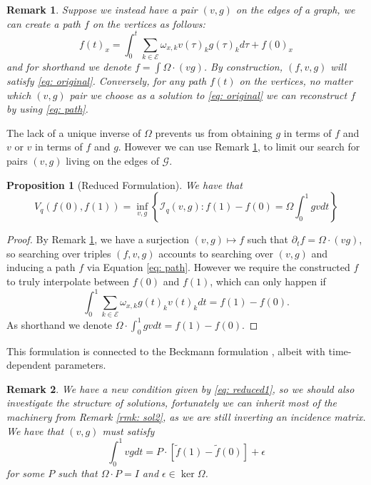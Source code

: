 \documentclass[conference]{IEEEtran}
\newcommand{\GG}{\mathcal{G}}
\newcommand{\EE}{\mathcal{E}}
\theoremstyle{ieeestyle}
\newtheorem{prop}{Proposition}
\newtheorem{rmk}{Remark}
\begin{document}
\begin{rmk}\label{rmk: sol1}
    Suppose we instead have a pair $(v,g)$ on the edges of a graph, we can create a path $f$ on the vertices as follows:
    \begin{equation}\label{eq: path}
        f(t)_x = \int_0^t \sum_{k \in \EE} \omega_{x,k}v(\tau)_kg(\tau)_k d\tau + f(0)_x
    \end{equation}
    and for shorthand we denote $f = \int \Omega \cdot(vg)$. By construction, $(f,v,g)$ will satisfy \eqref{eq: original}. Conversely, for any path $f(t)$ on the vertices, no matter which $(v,g)$ pair we choose as a solution to \eqref{eq: original} we can reconstruct $f$ by using \eqref{eq: path}.
\end{rmk}
The lack of a unique inverse of $\Omega$ prevents us from obtaining $g$ in terms of $f$ and $v$ or $v$ in terms of $f$ and $g$. However we can use Remark \ref{rmk: sol1}, to limit our search for pairs $(v,g)$ living on the edges of $\GG$. 
\begin{prop}[Reduced Formulation]\label{thm: simple}
    We have that
    \begin{equation*}
        V_q(f(0),f(1))= \inf_{v,g} \left\{ \mathcal{I}_q(v,g) : f(1) - f(0) = \Omega \textstyle \int_0^1 gv dt \right\}
    \end{equation*}
\end{prop}
\begin{proof}
    By Remark \ref{rmk: sol1}, we have a surjection $(v,g) \mapsto f$ such that $\partial_t f = \Omega \cdot (vg)$, so searching over triples $(f,v,g)$ accounts to searching over $(v,g)$ and inducing a path $f$ via Equation \eqref{eq: path}. However we require the constructed $f$ to truly interpolate between $f(0)$ and $f(1)$, which can only happen if 
    \begin{equation}\label{eq: reduced1}
        \int_0^1 \sum_{k \in \EE} \omega_{x,k}g(t)_kv(t)_k dt = f(1) - f(0).
    \end{equation}
    As shorthand we denote $\Omega \cdot \int_0^1 gv dt = f(1) - f(0)$.
\end{proof}
This formulation is connected to the Beckmann formulation \cite{beckmann1952continuous}, albeit with time-dependent parameters.
\begin{rmk}\label{rmk: sol3}
We have a new condition given by \eqref{eq: reduced1}, so we should also investigate the structure of solutions, fortunately we can inherit most of the machinery from Remark \ref{rmk: sol2}, as we are still inverting an incidence matrix. We have that $(v,g)$ must satisfy
\begin{equation}\label{eq: reducedcond}
    \int_0^1 vg dt = P \cdot [\tilde{f}(1) - \tilde{f}(0)] + \epsilon
\end{equation}
for some $P$ such that $\Omega \cdot P = I$ and $\epsilon \in \ker \Omega$.
\end{rmk}
\addtolength{\topskip}{2pt}
\end{document}
